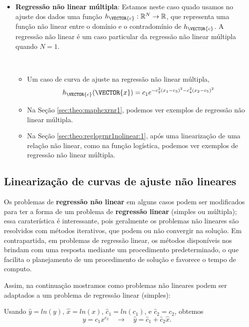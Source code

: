 \begin{itemize}
\item \textbf{Regressão não linear múltipla}: 
Estamos neste caso quado usamos no ajuste dos dados
uma função $h_{\VECTOR{c}}:\mathbb{R}^{N} \rightarrow \mathbb{R}$, 
que representa uma função não linear entre o domínio e o contradomínio de $h_{\VECTOR{c}}$.
A regressão não linear é um caso particular da regressão não linear múltipla quando $N=1$.
\begin{example}~
\begin{itemize}
\item Um caso de curva de ajuste na regressão não linear múltipla, 
\begin{equation}
h_{\VECTOR{c}}(\VECTOR{x})=c_1 e^{- c_2^2(x_1 -c_3)^2- c_4^2(x_2 -c_5)^2}
\end{equation}
\item Na Seção \ref{sec:theo:maphcxrnr1}, podemos ver exemplos de regressão não linear múltipla.
\item Na Seção \ref{sec:theo:reglogrnr1nolinear:1}, após uma linearização de uma relação não linear,
como na função logística, podemos ver exemplos de regressão não linear múltipla.
\end{itemize}
\end{example}
\end{itemize}

\subsection{Linearização de curvas de ajuste não lineares}

Os problemas de \textbf{regressão não linear}
em alguns casos podem ser modificados para ter a forma de um 
problema de \textbf{regressão linear} (simples ou múltipla);
essa caraterística é interessante, pois geralmente
os problemas não lineares são resolvidos com métodos iterativos,
que podem ou não convergir na solução.
Em contrapartida, em problemas de regressão linear,
os métodos disponíveis nos brindam com uma resposta mediante um procedimento 
predeterminado, 
o que facilita o planejamento de um procedimento de solução e favorece o tempo de computo.

Assim, na continuação mostramos 
como problemas não lineares podem ser 
adaptados a um problema de regressão linear (simples):
\begin{example}
Usando 
$\hat{y}=ln(y)$,  
$\hat{x}=ln(x)$, 
$\hat{c}_1=ln(c_1)$, e
$\hat{c}_2=c_2$, obtemos %
\begin{equation}
y=c_1x^{c_2}
\quad \rightarrow \quad 
\hat{y}=\hat{c}_1+\hat{c}_2 \hat{x}.
\end{equation}
\vspace{-2pt}
\end{example}

